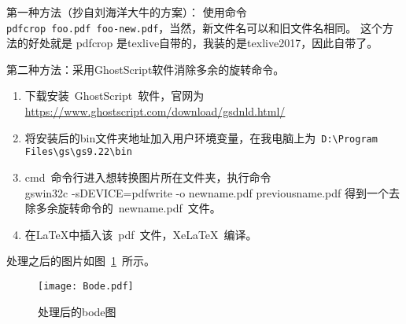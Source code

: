 第一种方法（抄自刘海洋大牛的方案）：
使用命令\\ \texttt{pdfcrop foo.pdf foo-new.pdf}，当然，新文件名可以和旧文件名相同。 这个方法的好处就是 pdfcrop 是texlive自带的，我装的是texlive2017，因此自带了。

第二种方法：采用GhostScript软件消除多余的旋转命令。
\begin{enumerate}
  \item 下载安装~GhostScript~软件，官网为\url{https://www.ghostscript.com/download/gsdnld.html/}

  \item 将安装后的bin文件夹地址加入用户环境变量，在我电脑上为~\verb|D:|\verb|\Program Files|\verb|\gs|\verb|\gs9.22|\verb|\bin|

  \item cmd~命令行进入想转换图片所在文件夹，执行命令\\gswin32c -sDEVICE=pdfwrite -o newname.pdf  previousname.pdf
        得到一个去除多余旋转命令的~newname.pdf~文件。

  \item 在\LaTeX{}中插入该~pdf~文件，XeLaTeX~编译。
\end{enumerate}

处理之后的图片如图~\ref{Bode}~所示。
\begin{figure}[H]
  \centering
  \texttt{[image: Bode.pdf]}
  \caption{处理后的bode图}
  \label{Bode}
\end{figure}





